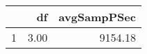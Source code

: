 \begin{table}[h]
\centering
\begin{tabular}{rrr}
  \hline
 & df & avgSampPSec \\ 
  \hline
1 & 3.00 & 9154.18 \\ 
   \hline
\end{tabular}
\end{table}
